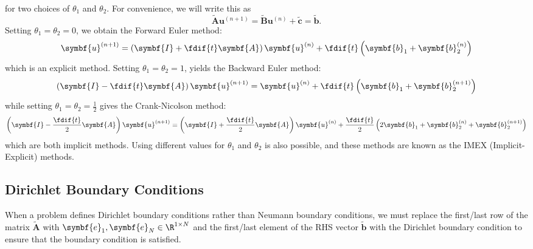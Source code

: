 \documentclass{article}
\begin{document}
for two choices of \(\theta_1\) and \(\theta_2\). For convenience, we will
write this as
\begin{equation*}
    \tilde{\symbf{A}} \symbf{u}^{\left( n+1 \right)} = \tilde{\symbf{B}} \symbf{u}^{\left( n \right)} + \tilde{\symbf{c}} = \tilde{\symbf{b}}.
\end{equation*}
Setting \(\theta_1 = \theta_2 = 0\), we obtain the Forward Euler method:
\begin{equation*}
    \symbf{u}^{\left( n+1 \right)} = \left( \symbf{I} + \fdif{t} \symbf{A} \right) \symbf{u}^{\left( n \right)} + \fdif{t} \left( \symbf{b}_1 + \symbf{b}_2^{\left( n \right)} \right)
\end{equation*}
which is an explicit method. Setting \(\theta_1 = \theta_2 = 1\), yields
the Backward Euler method:
\begin{equation*}
    \left( \symbf{I} - \fdif{t} \symbf{A} \right) \symbf{u}^{\left( n+1 \right)} = \symbf{u}^{\left( n \right)} + \fdif{t} \left( \symbf{b}_1 + \symbf{b}_2^{\left( n+1 \right)} \right)
\end{equation*}
while setting \(\theta_1 = \theta_2 = \frac{1}{2}\) gives the Crank-Nicolson
method:
\begin{equation*}
    \left( \symbf{I} - \frac{\fdif{t}}{2} \symbf{A} \right) \symbf{u}^{\left( n+1 \right)} = \left( \symbf{I} + \frac{\fdif{t}}{2} \symbf{A} \right) \symbf{u}^{\left( n \right)} + \frac{\fdif{t}}{2} \left( 2 \symbf{b}_1 + \symbf{b}_2^{\left( n \right)} + \symbf{b}_2^{\left( n+1 \right)} \right)
\end{equation*}
which are both implicit methods. Using different values for \(\theta_1\)
and \(\theta_2\) is also possible, and these methods are known as the
IMEX (Implicit-Explicit) methods.
\subsection{Dirichlet Boundary Conditions}
When a problem defines Dirichlet boundary conditions rather than
Neumann boundary conditions, we must replace the first/last row of the
matrix \(\tilde{\symbf{A}}\) with \(\symbf{e}_1,\symbf{e}_N \in \R^{1 \times N}\)
and the first/last element of the RHS vector \(\tilde{\symbf{b}}\) with
the Dirichlet boundary condition to ensure that the boundary condition
is satisfied.
\end{document}
